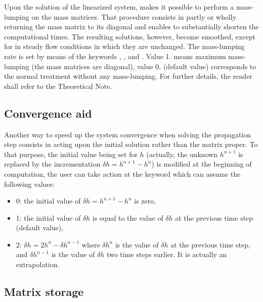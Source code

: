 Upon the solution of the linearized system,  makes it possible to
perform a mass-lumping on the mass matrices. That procedure consists in partly
or wholly returning the mass matrix to its diagonal and enables to
substantially shorten the computational times. The resulting solutions,
however, become smoothed, except for in steady flow conditions in which they
are unchanged. The mass-lumping rate is set by means of the keywords
, ,
 and . Value 1. means maximum mass-lumping (the mass matrices are
diagonal), value 0. (default value) corresponds to the normal treatment without
any mass-lumping. For further details, the reader shall refer to the 
Theoretical Note.

\subsection{Convergence aid}

Another way to speed up the system convergence when solving the propagation
step consists in acting upon the initial solution rather than the matrix
proper. To that purpose, the initial value being set for $h$ (actually,
the unknown $h^{n+1}$ is replaced by the incrementation $\delta h=h^{n+1} -h^{n}$)
is modified at the beginning of computation, the user can take action at the
keyword  which can assume the following values:

\begin{itemize}
\item 0: the initial value of $\delta h=h^{n+1} -h^{n} $ is zero,

\item 1: the initial value of $\delta h$ is equal to the value of $\delta h$
at the previous time step (default value),

\item 2: $\delta h=2h^{n} -\delta h^{n-1} $ where $\delta h^{n} $ is the value
of $\delta h$ at the previous time step, and $\delta h^{n-1} $ is the value of
$\delta h$ two time steps earlier. It is actually an extrapolation.
\end{itemize}


\subsection{Matrix storage}


